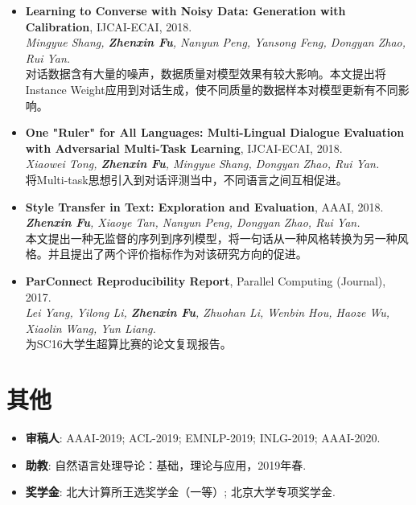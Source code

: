 \documentclass[letterpaper]{article}
\def\footerlink{https://zhenxinfu.com/zhenxinfu.pdf}
\begin{document}
\begin{itemize}
\item \textbf{Learning to Converse with Noisy Data: Generation with Calibration}, IJCAI-ECAI, 2018. \\
  {\it Mingyue Shang, \textbf{Zhenxin Fu}, Nanyun Peng, Yansong Feng, Dongyan Zhao, Rui Yan.}  \\
  对话数据含有大量的噪声，数据质量对模型效果有较大影响。本文提出将Instance Weight应用到对话生成，使不同质量的数据样本对模型更新有不同影响。

\item \textbf{One "Ruler" for All Languages: Multi-Lingual Dialogue Evaluation with Adversarial Multi-Task Learning}, IJCAI-ECAI, 2018. \\
  {\it Xiaowei Tong, \textbf{Zhenxin Fu}, Mingyue Shang, Dongyan Zhao, Rui Yan.}  \\
  将Multi-task思想引入到对话评测当中，不同语言之间互相促进。

\item \textbf{Style Transfer in Text: Exploration and Evaluation}, AAAI, 2018. \\
  {\it \textbf{Zhenxin Fu}, Xiaoye Tan, Nanyun Peng, Dongyan Zhao, Rui Yan.} \\
  本文提出一种无监督的序列到序列模型，将一句话从一种风格转换为另一种风格。并且提出了两个评价指标作为对该研究方向的促进。
  
\item \textbf{ParConnect Reproducibility Report}, Parallel Computing (Journal), 2017.\\
  {\it Lei Yang, Yilong Li, \textbf{Zhenxin Fu}, Zhuohan Li, Wenbin Hou, Haoze Wu, Xiaolin Wang, Yun Liang.} \\
  为SC16大学生超算比赛的论文复现报告。
\end{itemize}


\section*{其他}
\begin{itemize}
  \item \textbf{审稿人}: AAAI-2019; ACL-2019; EMNLP-2019; INLG-2019; AAAI-2020.
  \item \textbf{助教}: 自然语言处理导论：基础，理论与应用，2019年春.
  \item \textbf{奖学金}: 北大计算所王选奖学金（一等）; 北京大学专项奖学金.
\end{itemize}




\end{document}
